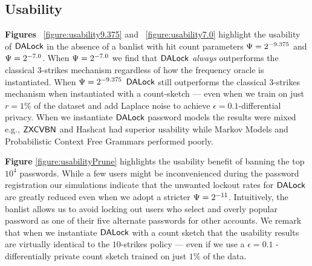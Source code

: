 \subsection{Usability}\label{section:ExperimentResult-usability} %
\textbf{Figures} ~\ref{figure:usability9.375} and ~\ref{figure:usability7.0} highlight the usability of $\mathsf{DALock}$ in the absence of a banlist with hit count parameters $\Psi = 2^{-9.375}$ and $\Psi=2^{-7.0}$. When $\Psi=2^{-7.0}$ we find that $\mathsf{DALock}$ {\em always} outperforms the classical $3$-strikes mechanism regardless of how the frequency oracle is instantiated. When $\Psi=2^{-9.375}$ $\mathsf{DALock}$ still outperforms the classical $3$-strikes mechanism when instantiated with a count-sketch --- even when we train on just $r=1\%$ of the dataset and add Laplace noise to achieve $\epsilon=0.1$-differential privacy. When we instantiate $\mathsf{DALock}$ password models the results were mixed e.g., $\mathsf{ZXCVBN}$ and Hashcat had superior usability while Markov Models and Probabilistic Context Free Grammars performed poorly. 

\textbf{Figure} \ref{figure:usabilityPrune} highlights the usability benefit of banning the top $10^4$ passwords. While a few users might be inconvenienced during the password registration our simulations indicate that the unwanted lockout rates for $\mathsf{DALock}$ are greatly reduced even when we adopt a stricter $\Psi = 2^{-11}$. Intuitively, the banlist allows us to avoid locking out users who select and overly popular password as one of their five alternate passwords for other accounts. We remark that when we instantiate $\mathsf{DALock}$ with a count sketch that the usability results are virtually identical to the $10$-strikes policy --- even if we use a $\epsilon=0.1$ -differentially private count sketch trained on just $1\%$ of the data.




